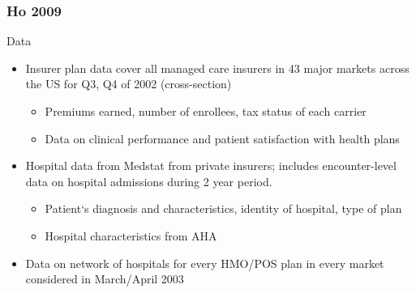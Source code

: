 \documentclass[notes=show]{beamer}
\begin{document}

\begin{frame}
\frametitle{Ho 2009}

Data
\begin{itemize}
\item Insurer plan data cover all managed care insurers in 43 major markets across the US for Q3, Q4 of 2002 (cross-section)
\begin{itemize}
\item Premiums earned, number of enrollees, tax status of each carrier
\item Data on clinical performance and patient satisfaction with health plans
\end{itemize}
\item Hospital data from Medstat from private insurers; includes encounter-level data on hospital admissions during 2 year period.
\begin{itemize}
\item Patient`s diagnosis and characteristics, identity of hospital, type of plan
\item Hospital characteristics from AHA
\end{itemize}
\item Data on network of hospitals for every HMO/POS plan in every market considered in March/April 2003

\end{itemize}
\end{frame}
\end{document}
